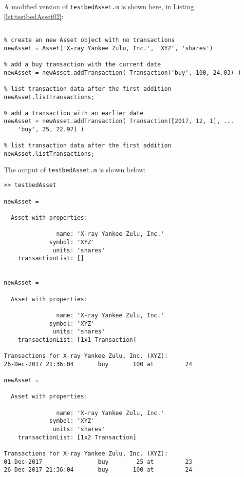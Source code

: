 A modified version of \texttt{testbedAsset.m} is shown here, in Listing \ref{lst:testbedAsset02}:
\begin{lstlisting}[style=Matlab-editor, caption={The code listing for \texttt{testbedAsset.m}. Here, the testbed adds transactions to \texttt{newAsset} and invokes the \texttt{listTransactions} method to display information about associated \texttt{Transaction} objects.}, label={lst:testbedAsset02}]
% testbedAsset.m

% create an new Asset object with no transactions
newAsset = Asset('X-ray Yankee Zulu, Inc.', 'XYZ', 'shares')

% add a buy transaction with the current date
newAsset = newAsset.addTransaction( Transaction('buy', 100, 24.03) )

% list transaction data after the first addition
newAsset.listTransactions;

% add a transaction with an earlier date
newAsset = newAsset.addTransaction( Transaction([2017, 12, 1], ...
    'buy', 25, 22.97) )

% list transaction data after the first addition
newAsset.listTransactions;
\end{lstlisting}
The output of \texttt{testbedAsset.m} is shown below:
\begin{lstlisting}[style=Matlab-editor, caption={The output of \texttt{testbedAsset.m}}, label={lst:AssetOutput02}]
>> testbedAsset

newAsset = 

  Asset with properties:

               name: 'X-ray Yankee Zulu, Inc.'
             symbol: 'XYZ'
              units: 'shares'
    transactionList: []


newAsset = 

  Asset with properties:

               name: 'X-ray Yankee Zulu, Inc.'
             symbol: 'XYZ'
              units: 'shares'
    transactionList: [1x1 Transaction]

Transactions for X-ray Yankee Zulu, Inc. (XYZ):
26-Dec-2017 21:36:04       buy       100 at         24

newAsset = 

  Asset with properties:

               name: 'X-ray Yankee Zulu, Inc.'
             symbol: 'XYZ'
              units: 'shares'
    transactionList: [1x2 Transaction]

Transactions for X-ray Yankee Zulu, Inc. (XYZ):
01-Dec-2017                buy        25 at         23
26-Dec-2017 21:36:04       buy       100 at         24
\end{lstlisting}
